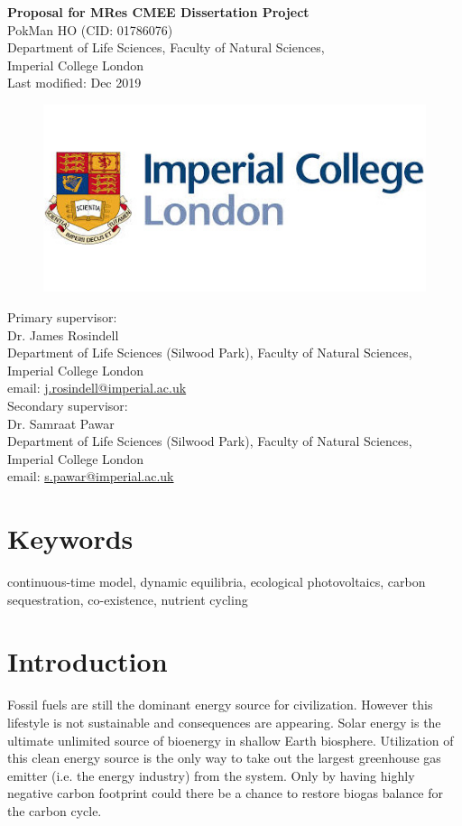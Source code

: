 \documentclass[a4paper, 11pt]{article}
\title{\ReportTitle}
\author{\ReportAuthor}
\date{}
\newcommand{\ReportTitle}{Proposal for MRes CMEE Dissertation Project}
\newcommand{\ReportAuthor}{PokMan HO (CID: 01786076)}
\newcommand{\ReportAffil}{Department of Life Sciences, Faculty of Natural Sciences,\\Imperial College London}
\begin{document}
	\begin{center}
		\Huge\textbf{\ReportTitle}\\
		\LARGE\ReportAuthor\\
		\Large\ReportAffil\\
		\Large{Last modified: Dec 2019}
	\end{center}
	\begin{figure}[h]
		\centering\includegraphics[width=\linewidth]{icl.jpg}
	\end{figure}
Primary supervisor:\\
\indent Dr. James Rosindell\\
\indent Department of Life Sciences (Silwood Park), Faculty of Natural Sciences, Imperial College London\\
\indent email: \href{mailto:j.rosindell@imperial.ac.uk}{j.rosindell@imperial.ac.uk}\\
Secondary supervisor:\\
\indent Dr. Samraat Pawar\\
\indent Department of Life Sciences (Silwood Park), Faculty of Natural Sciences, Imperial College London\\
\indent email: \href{mailto:s.pawar@imperial.ac.uk}{s.pawar@imperial.ac.uk}
\clearpage
\section{Keywords}
continuous-time model, dynamic equilibria, ecological photovoltaics, carbon sequestration, co-existence, nutrient cycling
\section{Introduction}
Fossil fuels are still the dominant energy source for civilization.  However this lifestyle is not sustainable and consequences are appearing.  Solar energy is the ultimate unlimited source of bioenergy in shallow Earth biosphere.  Utilization of this clean energy source is the only way to take out the largest greenhouse gas emitter (i.e. the energy industry) from the system.  Only by having highly negative carbon footprint could there be a chance to restore biogas balance for the carbon cycle.\\
\end{document}

